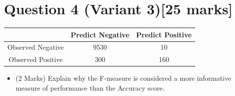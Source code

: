 \documentclass[]{article}
\begin{document}
\section*{Question 4 (Variant 3)[25 marks]}


\begin{center}
\begin{tabular}{|c|c|c|}
\hline  & \phantom{spa}Predict Negative\phantom{spa} & \phantom{spa}Predict Positive\phantom{spa} \\ 
\hline\phantom{spa} Observed Negative \phantom{spa}&	9530	&	10	\\ 
\hline \phantom{spa}Observed Positive\phantom{spa} & 	300	&	160	\\ 
\hline 
\end{tabular} 
\end{center}

\begin{itemize}	
\item[(v)] (2 Marks) Explain why the F-measure is considered a more informative measure of performance than the Accuracy score.

\end{itemize}
\end{document}
